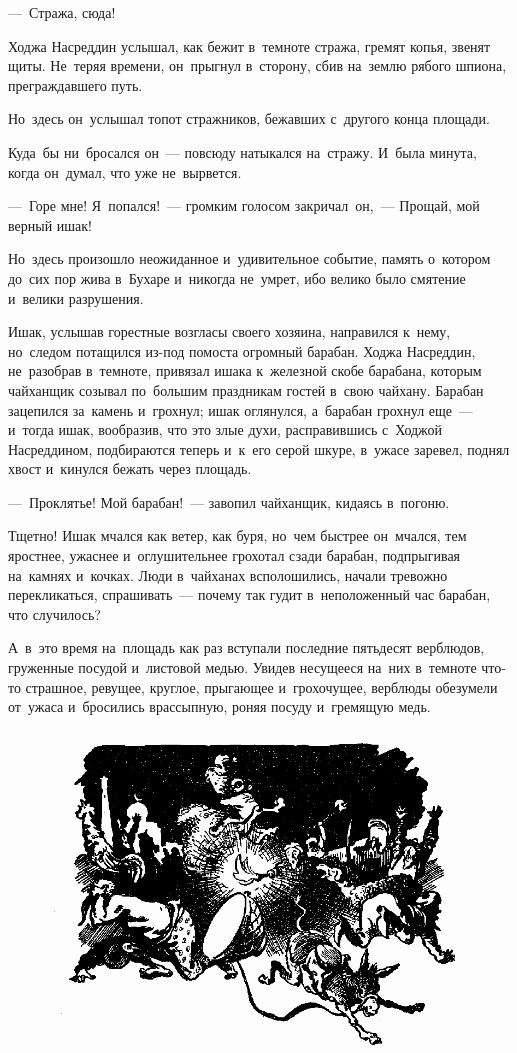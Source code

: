 \documentclass[12pt,a4paper]{book}
\begin{document}
—~Стража, сюда!

Ходжа Насреддин услышал, как бежит в~темноте стража, гремят копья, звенят щиты. Не~теряя времени, он~прыгнул в~сторону, сбив на~землю рябого шпиона, преграждавшего путь.

Но~здесь он~услышал топот стражников, бежавших с~другого конца площади.

Куда~бы ни~бросался он~— повсюду натыкался на~стражу. И~была минута, когда он~думал, что уже не~вырвется.

—~Горе мне! Я~попался!~— громким голосом закричал~он,~— Прощай, мой верный ишак!

Но~здесь произошло неожиданное и~удивительное событие, память о~котором до~сих пор жива в~Бухаре и~никогда не~умрет, ибо велико было смятение и~велики разрушения.

Ишак, услышав горестные возгласы своего хозяина, направился к~нему, но~следом потащился из-под помоста огромный барабан. Ходжа Насреддин, не~разобрав в~темноте, привязал ишака к~железной скобе барабана, которым чайханщик созывал по~большим праздникам гостей в~свою чайхану. Барабан зацепился за~камень и~грохнул; ишак оглянулся, а~барабан грохнул еще~— и~тогда ишак, вообразив, что это злые духи, расправившись с~Ходжой Насреддином, подбираются теперь и~к~его серой шкуре, в~ужасе заревел, поднял хвост и~кинулся бежать через площадь.

—~Проклятье! Мой барабан!~— завопил чайханщик, кидаясь в~погоню.

Тщетно! Ишак мчался как ветер, как буря, но~чем быстрее он~мчался, тем яростнее, ужаснее и~оглушительнее грохотал сзади барабан, подпрыгивая на~камнях и~кочках. Люди в~чайханах всполошились, начали тревожно перекликаться, спрашивать~— почему так гудит в~неположенный час барабан, что случилось?

А~в~это время на~площадь как раз вступали последние пятьдесят верблюдов, груженные посудой и~листовой медью. Увидев несущееся на~них в~темноте что-то страшное, ревущее, круглое, прыгающее и~грохочущее, верблюды обезумели от~ужаса и~бросились врассыпную, роняя посуду и~гремящую медь.

\begin{figure}[h]
\centering
\includegraphics[width=\textwidth]{6.png}
\end{figure}
\end{document}
